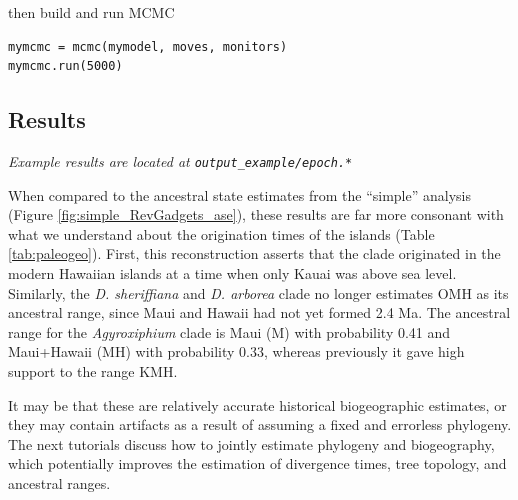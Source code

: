 then build and run MCMC

\begin{snugshade}
\begin{lstlisting}
mymcmc = mcmc(mymodel, moves, monitors)
mymcmc.run(5000)
\end{lstlisting}
\end{snugshade}

\subsection{Results}

\begin{center}
{\it Example results are located at {\tt output\_example/epoch.*}}
\end{center}

When compared to the ancestral state estimates from the ``simple'' analysis (Figure \ref{fig:simple_RevGadgets_ase}), these results are far more consonant with what we understand about the origination times of the islands (Table \ref{tab:paleogeo}).
First, this reconstruction asserts that the clade originated in the modern Hawaiian islands at a time when only Kauai was above sea level.
Similarly, the {\it D. sheriffiana} and {\it D. arborea} clade no longer estimates OMH as its ancestral range, since Maui and Hawaii had not yet formed 2.4 Ma.
The ancestral range for the {\it Agyroxiphium} clade is Maui (M) with probability 0.41 and Maui+Hawaii (MH) with probability 0.33, whereas previously it gave high support to the range KMH.

It may be that these are relatively accurate historical biogeographic estimates, or they may contain artifacts as a result of assuming a fixed and errorless phylogeny.
The next tutorials discuss how to jointly estimate phylogeny and biogeography, which potentially improves the estimation of divergence times, tree topology, and ancestral ranges.


